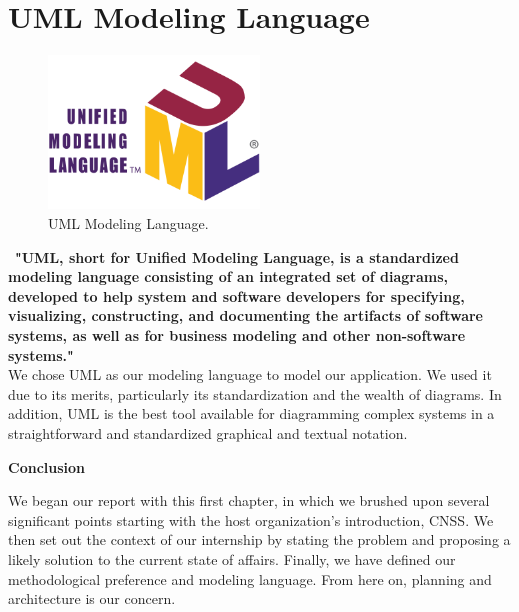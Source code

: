 \section{UML Modeling Language}
\begin{figure}[h]
    \centering
    \includegraphics[width=0.5\textwidth]{figures/UML_logo.png} 
    \caption{UML Modeling Language.}
\end{figure} \ 
\textbf{"UML, short for Unified Modeling Language, is a standardized modeling language consisting of an integrated set of diagrams, developed to help system and software developers for specifying, visualizing, constructing, and documenting the artifacts of software systems, as well as for business modeling and other non-software systems." \cite{samplewebs3}}\\
We chose UML as our modeling language to model our application. We used it due to its merits, particularly its standardization and the wealth of diagrams.
In addition, UML is the best tool available for diagramming complex systems in a straightforward and standardized graphical and textual notation.
\newpage
\begin{center}
    \doublespacing 
    \centering
    \LARGE\textbf{Conclusion} 
    \vspace{1cm} \\
    \raggedright
\end{center}
We began our report with this first chapter, in which we brushed upon several significant points starting with the host organization's introduction, CNSS.
\vspace{0.5cm}
We then set out the context of our internship by stating the problem and proposing a likely solution to the current state of affairs.
\vspace{0.5cm}
Finally, we have defined our methodological preference and modeling language. From here on, planning and architecture is our concern.

